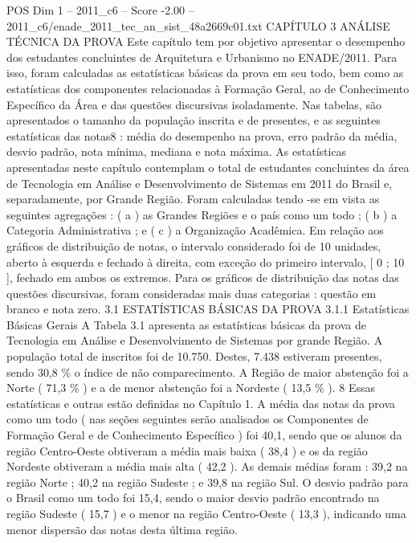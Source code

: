 \begin{textsample}{POS Dim 1 – 2011\_c6 – Score -2.00 – 2011\_c6/enade\_2011\_tec\_an\_sist\_48a2669c01.txt}  \label{ex:f1_pos_219}
CAPÍTULO 3 ANÁLISE TÉCNICA DA PROVA Este capítulo tem por objetivo apresentar o desempenho dos estudantes concluintes de Arquitetura e Urbanismo no ENADE/2011.
Para isso, foram calculadas as estatísticas básicas da prova em seu todo, bem como as estatísticas dos componentes relacionadas à Formação Geral, ao de Conhecimento Específico da Área e das questões discursivas isoladamente.
Nas tabelas, são apresentados o tamanho da população inscrita e de presentes, e as seguintes estatísticas das notas8 : média do desempenho na prova, erro padrão da média, desvio padrão, nota mínima, mediana e nota máxima.
As estatísticas apresentadas neste capítulo contemplam o total de estudantes concluintes da área de Tecnologia em Análise e Desenvolvimento de Sistemas em 2011 do Brasil e, separadamente, por Grande Região.
Foram calculadas tendo -se em vista as seguintes agregações : ( a ) as Grandes Regiões e o país como um todo ; ( b ) a Categoria Administrativa ; e ( c ) a Organização Acadêmica.
Em relação aos gráficos de distribuição de notas, o intervalo considerado foi de 10 unidades, aberto à esquerda e fechado à direita, com exceção do primeiro intervalo, [ 0 ; 10 ], fechado em ambos os extremos.
Para os gráficos de distribuição das notas das questões discursivas, foram consideradas mais duas categorias : questão em branco e nota zero. 3.1 ESTATÍSTICAS BÁSICAS DA PROVA 3.1.1 Estatísticas Básicas Gerais A Tabela 3.1 apresenta as estatísticas básicas da prova de Tecnologia em Análise e Desenvolvimento de Sistemas por grande Região.
A população total de inscritos foi de 10.750.
Destes, 7.438 estiveram presentes, sendo 30,8 \% o índice de não comparecimento.
A Região de maior abstenção foi a Norte ( 71,3 \% ) e a de menor abstenção foi a Nordeste ( 13,5 \% ). 8 Essas estatísticas e outras estão definidas no Capítulo 1.
A média das notas da prova como um todo ( nas seções seguintes serão analisados os Componentes de Formação Geral e de Conhecimento Específico ) foi 40,1, sendo que os alunos da região Centro-Oeste obtiveram a média mais baixa ( 38,4 ) e os da região Nordeste obtiveram a média mais alta ( 42,2 ).
As demais médias foram : 39,2 na região Norte ; 40,2 na região Sudeste ; e 39,8 na região Sul.
O desvio padrão para o Brasil como um todo foi 15,4, sendo o maior desvio padrão encontrado na região Sudeste ( 15,7 ) e o menor na região Centro-Oeste ( 13,3 ), indicando uma menor dispersão das notas desta última região.

\end{textsample}
